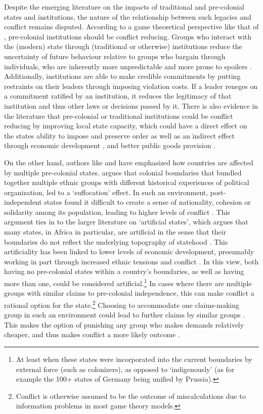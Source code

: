 \documentclass[12pt]{article}
\begin{document}
Despite the emerging literature on the impacts of traditional and pre-colonial
states and institutions, the nature of the relationship between such legacies
and conflict remains disputed. According to a game theoretical perspective like
that of \citet{Fearon1995}, pre-colonial institutions should be conflict
reducing. Groups who interact with the (modern) state through (traditional or
otherwise) institutions reduce the uncertainty of future behaviour relative to
groups who bargain through individuals, who are inherently more unpredictable
and more prone to spoilers \citep{Wig2016}. Additionally, institutions are able
to make credible commitments by putting restraints on their leaders through
imposing violation costs. If a leader reneges on a commitment ratified by an
institution, it reduces the legitimacy of that institution and thus other laws
or decisions passed by it. There is also evidence in the literature that
pre-colonial or traditional institutions could be conflict reducing by improving
local state capacity, which could have a direct effect on the states ability to
impose and preserve order as well as an indirect effect through economic
development \citep{Depetris-Chauvin2016}, and better public goods provision
\citep{Wilfahrt_2021}. 

On the other hand, authors like \citet{Englebert2002} and \citet{Alesina2011}
have emphasized how countries are affected by multiple pre-colonial states.
\citet{Englebert2002} argues that colonial boundaries that bundled together
multiple ethnic groups with different historical experiences of political
organization, led to a `suffocation' effect. In such an environment,
post-independent states found it difficult to create a sense of nationality,
cohesion or solidarity among its population, leading to higher levels of
conflict \citep{Englebert2002}. This argument ties in to the larger literature
on `artificial states', which argues that many states, in Africa in particular,
are artificial in the sense that their boundaries do not reflect the underlying
topography of statehood \citep{Alesina2011, Clapham1996, Jackson1991}. This
artificiality has been linked to lower levels of economic development,
presumably working in part through increased ethnic tensions and conflict
\citep{Alesina2011}. In this view, both having no pre-colonial states within a
country's boundaries, as well
as having more than one, could be considered artificial.\footnote{At least when
	these states were incorporated into the current boundaries by external
force (such as colonizers), as opposed to `indigenously' (as for example the
100+ states of Germany being unified by Prussia).} In cases where there are
multiple groups with similar claims to pre-colonial independence, this can make
conflict a rational option for the state.\footnote{Conflict is otherwise assumed
to be the outcome of miscalculations due to information problems in most game
theory models.} Choosing to accommodate one claims-making group in such an
environment could lead to further claims by similar groups \citep{Walter2009}.
This makes the option of punishing any group who makes demands relatively
cheaper, and thus makes conflict a more likely outcome \citep{Wishman}.
\end{document}
